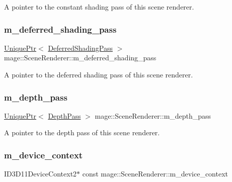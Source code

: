 A pointer to the constant shading pass of this scene renderer. \hypertarget{classmage_1_1_scene_renderer_a05aa800b776f98b8b11e2d38a25c07e5}{}\label{classmage_1_1_scene_renderer_a05aa800b776f98b8b11e2d38a25c07e5} 
\subsubsection{\texorpdfstring{m\+\_\+deferred\+\_\+shading\+\_\+pass}{m\_deferred\_shading\_pass}}
{\footnotesize\ttfamily \hyperlink{namespacemage_a3316d7143a973e37adf1110f2e80ca31}{Unique\+Ptr}$<$ \hyperlink{classmage_1_1_deferred_shading_pass}{Deferred\+Shading\+Pass} $>$ mage\+::\+Scene\+Renderer\+::m\+\_\+deferred\+\_\+shading\+\_\+pass\hspace{0.3cm}{\ttfamily [private]}}

A pointer to the deferred shading pass of this scene renderer. \hypertarget{classmage_1_1_scene_renderer_abdb26cf0c454d1e5a7fed949191c1044}{}\label{classmage_1_1_scene_renderer_abdb26cf0c454d1e5a7fed949191c1044} 
\subsubsection{\texorpdfstring{m\+\_\+depth\+\_\+pass}{m\_depth\_pass}}
{\footnotesize\ttfamily \hyperlink{namespacemage_a3316d7143a973e37adf1110f2e80ca31}{Unique\+Ptr}$<$ \hyperlink{classmage_1_1_depth_pass}{Depth\+Pass} $>$ mage\+::\+Scene\+Renderer\+::m\+\_\+depth\+\_\+pass\hspace{0.3cm}{\ttfamily [private]}}

A pointer to the depth pass of this scene renderer. \hypertarget{classmage_1_1_scene_renderer_a163ff32807bea62e11fa06c5adf2a291}{}\label{classmage_1_1_scene_renderer_a163ff32807bea62e11fa06c5adf2a291} 
\subsubsection{\texorpdfstring{m\+\_\+device\+\_\+context}{m\_device\_context}}
{\footnotesize\ttfamily I\+D3\+D11\+Device\+Context2$\ast$ const mage\+::\+Scene\+Renderer\+::m\+\_\+device\+\_\+context\hspace{0.3cm}{\ttfamily [private]}}

